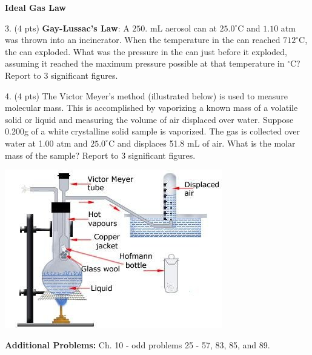 \documentclass[11pt]{article}
\begin{document}

\vspace{2.5in}

\textbf{Ideal Gas Law}

3. (4 pts) \textbf{Gay-Lussac's Law}: A $250.$ mL aerosol can at $25.0^\circ\text{C}$ and $1.10$ atm was
thrown into an incinerator. When the temperature in the can reached $712^\circ\text{C}$, the
can exploded. What was the pressure in the can just before it exploded, assuming it reached
the maximum pressure possible at that temperature in $^\circ\text{C}$? Report to 3 significant figures.


\vspace{2.5in}

4. (4 pts) The Victor Meyer's method (illustrated below) is used to measure molecular mass. This
is accomplished by vaporizing a known mass of a volatile solid or liquid and measuring
the volume of air displaced over water. Suppose 0.200g of a white crystalline solid sample is
vaporized. The gas is collected over water at 1.00 atm and $25.0^\circ\text{C}$ and displaces
51.8 mL of air. What is the molar mass of the sample? Report to 3 significant figures.

\begin{center}
  \includegraphics[scale=0.55]{meyers.jpeg}
\end{center}

% 

\vfill
\textbf{Additional Problems:} Ch. 10 - odd problems 25 - 57, 83, 85, and 89.

\end{document}

